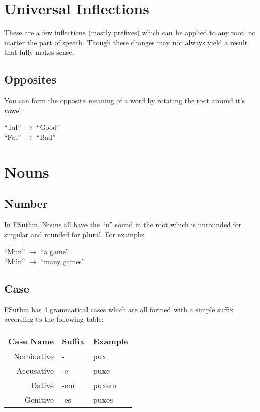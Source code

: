 \documentclass{book}
\begin{document}
\section{Universal Inflections}
These are a few inflections (mostly prefixes) which can be applied to any root, no matter the
part of speech. Though these changes may not always yield a result that fully makes sense.

\subsection{Opposites}
You can form the opposite meaning of a word by rotating the root around it's vowel:

\begin{center}
    ``Taf'' $\rightarrow$ ``Good'' \\
    ``Fat'' $\rightarrow$ ``Bad''
\end{center}

\section{Nouns}
\subsection{Number}
In FSutlun, Nouns all have the ``u'' sound in the root which is unrounded for singular and rounded for plural.
For example:

\begin{center}
    ``Mun'' $\rightarrow$ ``a game'' \\
    ``Mún'' $\rightarrow$ ``many games''
\end{center}

\subsection{Case}
FSutlun has 4 grammatical cases which are all formed with a simple suffix according to the following table:

\begin{center}
    \begin{tabular}{|r|l|l|}
        \hline
        Case Name   & Suffix    & Example \\
        \hline
        Nominative  & -         & pux \\
        Accusative  & -e        & puxe \\
        Dative      & -em       & puxem \\
        Genitive    & -es       & puxes \\
        \hline
    \end{tabular}
\end{center}
\end{document}
